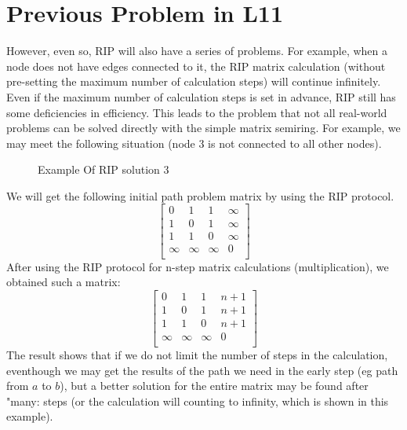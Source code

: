 \documentclass[a4paper,12pt,twoside,openright]{report}
\begin{document}
\section{Previous Problem in L11}
However, even so, RIP will also have a series of problems. For example, when a node does not have edges connected to it, the RIP matrix calculation (without pre-setting the maximum number of calculation steps) will continue infinitely. Even if the maximum number of calculation steps is set in advance, RIP still has some deficiencies in efficiency. 
This leads to the problem that not all real-world problems can be solved directly with the simple matrix semiring. 
For example, we may meet the following situation (node 3 is not connected to all other nodes).
\begin{figure}[H]
\centering
{}
\label{example:rip:3}
\caption{Example Of RIP solution 3}
\end{figure}
We will get the following initial path problem matrix by using the RIP protocol.
\[
\begin{bmatrix}
    0 & 1 & 1 & \infty \\
    1 & 0 & 1 & \infty \\
    1 & 1 & 0 & \infty \\
    \infty & \infty & \infty & 0 \\
\end{bmatrix}
\]
After using the RIP protocol for n-step matrix calculations (multiplication), we obtained such a matrix:
\[
\begin{bmatrix}
    0 & 1 & 1 & n+1 \\
    1 & 0 & 1 & n+1 \\
    1 & 1 & 0 & n+1 \\
    \infty & \infty & \infty & 0 \\
\end{bmatrix}
\]
The result shows that if we do not limit the number of steps in the calculation, eventhough we may get the results of the path we need in the early step (eg path from $a$ to $b$), but a better solution for the entire matrix may be found after "many: steps (or the calculation will counting to infinity, which is shown in this example).
\end{document}
